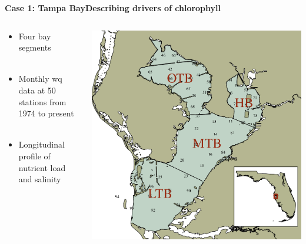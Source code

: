\documentclass[serif]{beamer}\usepackage[]{graphicx}\usepackage[]{color}
\begin{document}


\begin{frame}{\textbf{Case 1: Tampa Bay}}{\textbf{Describing drivers of chlorophyll}}
\begin{columns}
\begin{column}{0.5\textwidth}
\begin{itemize}
\item Four bay segments\\~\\
\item Monthly wq data at 50 stations from 1974 to present \\~\\
\item Longitudinal profile of nutrient load and salinity \\~\\
\end{itemize}
\vspace{0cm}\hspace*{15pt}
\end{column}
\begin{column}{0.5\textwidth}
\centerline{\includegraphics[width = \textwidth]{fig/tb_map.pdf}}
\end{column}
\end{columns}
\end{frame}
\end{document}
